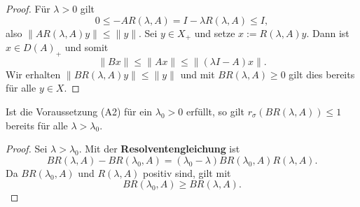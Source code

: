 \begin{proof}
\par
Für $\lambda >0$ gilt
\begin{equation*}
0\leq -AR(\lambda, A)=I-\lambda R(\lambda, A)\leq I,
\end{equation*}
also $\|AR(\lambda, A)y\|\leq\|y\|$. Sei $y\in X_+$ und setze $x:=R(\lambda, A)y$. Dann ist $x\in D(A)_+$ und somit \begin{equation*}
\|Bx\|\leq \|Ax\|\leq \|(\lambda I-A)x\|.    
\end{equation*}
Wir erhalten $\|BR(\lambda, A)y\|\leq \|y\|$ und mit $BR(\lambda, A)\geq0$ gilt dies bereits für alle $y\in X$. 
\end{proof}

\begin{bem}\label{BR(lambda, A) fallend}
Ist die Voraussetzung (A2) für ein $\lambda_0>0$ erfüllt, so gilt $r_\sigma(BR(\lambda, A))\leq1$ bereits für alle $\lambda > \lambda_0$. 
\end{bem}

\begin{proof}
\par
Sei $\lambda > \lambda_0$. Mit der \index{}\textbf{Resolventengleichung} ist
\begin{equation*}
BR(\lambda, A)-BR(\lambda_0, A)=(\lambda_0 - \lambda)BR(\lambda_0, A)R(\lambda, A).
\end{equation*}
Da $BR(\lambda_0, A)$ und $R(\lambda,A)$ positiv sind, gilt mit   
\begin{equation*}
BR(\lambda_0, A)\geq BR(\lambda,A).
\end{equation*}
\end{proof}

